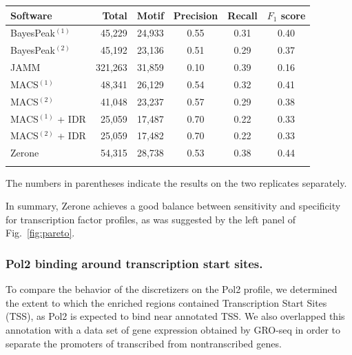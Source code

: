 \documentclass{bioinfo}
\begin{document}
\begin{table}[!b]
{\begin{tabular}{lrrccc}
        \toprule
        \textbf{Software}  & \textbf{Total}  & \textbf{Motif} &
        \textbf{Precision} & \textbf{Recall} & \textbf{$F_{1}$ score} \\
        \midrule
        BayesPeak$^{(1)}$  &  45,229 & 24,933 & 0.55 & 0.31 & 0.40 \\
        BayesPeak$^{(2)}$  &  45,192 & 23,136 & 0.51 & 0.29 & 0.37 \\
        JAMM               & 321,263 & 31,859 & 0.10 & 0.39 & 0.16 \\
        MACS$^{(1)}$       &  48,341 & 26,129 & 0.54 & 0.32 & 0.41 \\
        MACS$^{(2)}$       &  41,048 & 23,237 & 0.57 & 0.29 & 0.38 \\
        MACS$^{(1)}$ + IDR &  25,059 & 17,487 & 0.70 & 0.22 & 0.33 \\
        MACS$^{(2)}$ + IDR &  25,059 & 17,482 & 0.70 & 0.22 & 0.33 \\
        Zerone             &  54,315 & 28,738 & 0.53 & 0.38 & 0.44 \\
        \botrule
\end{tabular}}{The numbers in parentheses indicate the results on the two
replicates separately.}
\end{table}

In summary, Zerone achieves a good balance between sensitivity and
specificity for transcription factor profiles, as was suggested by
the left panel of Fig.~\ref{fig:pareto}.

\subsubsection{Pol2 binding around transcription start sites.}
\label{subsub:pol2}
To compare the behavior of the discretizers on the Pol2 profile,
we determined the extent to which the enriched regions contained
Transcription Start Sites (TSS), as Pol2 is expected to bind near
annotated TSS. We also overlapped this annotation with a data set of
gene expression obtained by GRO-seq in order to separate the
promoters of transcribed from nontranscribed genes.
\end{document}

